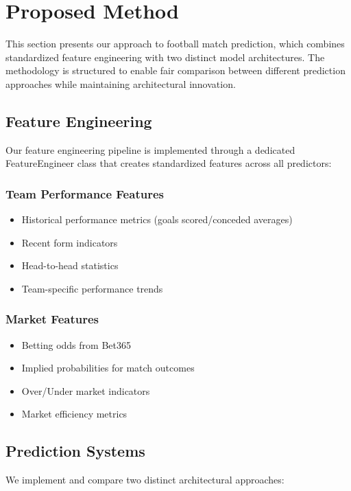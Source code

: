 \documentclass[conference]{IEEEtran}
\begin{document}
\section{Proposed Method}
This section presents our approach to football match prediction, which combines standardized feature engineering with two distinct model architectures. The methodology is structured to enable fair comparison between different prediction approaches while maintaining architectural innovation.

\subsection{Feature Engineering}
Our feature engineering pipeline is implemented through a dedicated FeatureEngineer class that creates standardized features across all predictors:

\subsubsection{Team Performance Features}
\begin{itemize}
\item Historical performance metrics (goals scored/conceded averages)
\item Recent form indicators
\item Head-to-head statistics
\item Team-specific performance trends
\end{itemize}

\subsubsection{Market Features}
\begin{itemize}
\item Betting odds from Bet365
\item Implied probabilities for match outcomes
\item Over/Under market indicators
\item Market efficiency metrics
\end{itemize}

\subsection{Prediction Systems}
We implement and compare two distinct architectural approaches:
\end{document}

